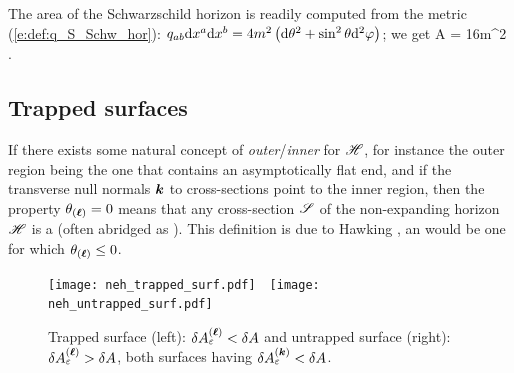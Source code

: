 \begin{example} \label{x:neh:Schwarz_hor_area}
The area of the Schwarzschild horizon is readily computed from
the metric (\ref{e:def:q_S_Schw_hor}):
$q_{ab} \mathrm{d} x^a \mathrm{d} x^b = 4m^2 \left( \mathrm{d}\theta^2 + \sin^2\theta \mathrm{d}^2\varphi \right)$;
we get
\be \label{e:neh:area_Schwarz}
     A = 16\pi m^2 .
\ee
\end{example}

\subsection{Trapped surfaces} \label{s:neh:trapped_surfaces}

If there exists some natural concept of \emph{outer}/\emph{inner} for $\mathscr{H}$, for
instance the outer region being the one that contains an asymptotically flat end,
and if the transverse null normals $\bm{k}$ to cross-sections point to the inner region, then
the property $\theta_{(\bm{\ell})}=0$ means that any cross-section $\mathscr{S}$ of the
non-expanding horizon $\mathscr{H}$ is a
(often abridged as ). This definition is due to
Hawking \cite{Hawki73}, an
would be one for which $\theta_{(\bm{\ell})}\leq 0$.

\begin{figure}
\centerline{\texttt{[image: neh\_trapped\_surf.pdf]}\ \qquad \
\texttt{[image: neh\_untrapped\_surf.pdf]}
}
\caption[]{\label{f:neh:trapped_surf} \footnotesize
Trapped surface (left): $\delta A^{(\bm{\ell})}_\varepsilon  < \delta A$
and untrapped surface (right): $\delta A^{(\bm{\ell})}_\varepsilon  > \delta A$,
both surfaces having $\delta A^{(\bm{k})}_\varepsilon  < \delta A$.
}
\end{figure}


